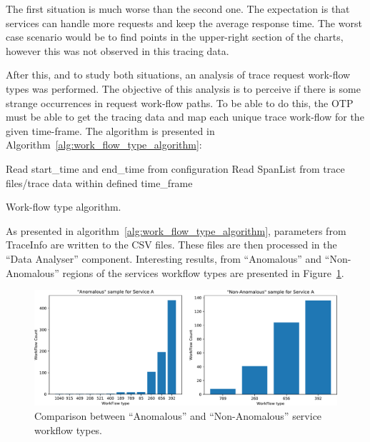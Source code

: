 The first situation is much worse than the second one. The expectation is that services can handle more requests and keep the average response time. The worst case scenario would be to find points in the upper-right section of the charts, however this was not observed in this tracing data.

After this, and to study both situations, an analysis of trace request work-flow types was performed. The objective of this analysis is to perceive if there is some strange occurrences in request work-flow paths. To be able to do this, the OTP must be able to get the tracing data and map each unique trace work-flow for the given time-frame. The algorithm is presented in Algorithm~\ref{alg:work_flow_type_algorithm}:

\begin{algorithm}
  Read start\_time and end\_time from configuration\;
  Read SpanList from trace files/trace data within defined time\_frame\;
  \caption{Work-flow type algorithm.}
  \label{alg:work_flow_type_algorithm}
\end{algorithm}

As presented in algorithm~\ref{alg:work_flow_type_algorithm}, parameters from TraceInfo are written to the CSV files. These files are then processed in the ``Data Analyser'' component. Interesting results, from ``Anomalous'' and ``Non-Anomalous'' regions of the services workflow types are presented in Figure~\ref{fig:work_flow_type_analysis}.

\begin{figure}
  \centerline{\includegraphics[width=1.0\linewidth]{images/workflow_type_count.pdf}}
  \caption{Comparison between ``Anomalous'' and ``Non-Anomalous'' service workflow types.}
  \label{fig:work_flow_type_analysis}
\end{figure}

